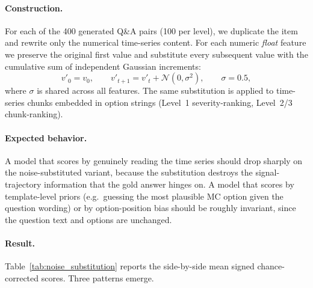 \paragraph{Construction.} For each of the 400 generated Q\&A pairs (100 per level), we duplicate the item and rewrite only the numerical time-series content. For each numeric \emph{float} feature we preserve the original first value and substitute every subsequent value with the cumulative sum of independent Gaussian increments:
\begin{equation*}
    v'_0 = v_0, \qquad v'_{t+1} = v'_t + \mathcal{N}(0, \sigma^2), \qquad \sigma = 0.5,
\end{equation*}
where $\sigma$ is shared across all features. The same substitution is applied to time-series chunks embedded in option strings (Level~1 severity-ranking, Level~2/3 chunk-ranking).

\paragraph{Expected behavior.} A model that scores by genuinely reading the time series should drop sharply on the noise-substituted variant, because the substitution destroys the signal-trajectory information that the gold answer hinges on. A model that scores by template-level priors (e.g.\ guessing the most plausible MC option given the question wording) or by option-position bias should be roughly invariant, since the question text and options are unchanged.

\paragraph{Result.} Table~\ref{tab:noise_substitution} reports the side-by-side mean signed chance-corrected scores. Three patterns emerge.

